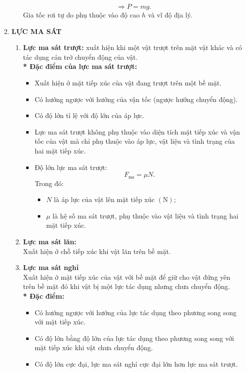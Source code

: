 \begin{enumerate}[label=\bfseries\Roman*.]
\begin{enumerate}[label=\bfseries\arabic*.]
	$$\Rightarrow P=mg.$$
	Gia tốc rơi tự do phụ thuộc vào độ cao $h$ và vĩ độ địa lý.
	\end{enumerate}
	\item \textbf{LỰC MA SÁT}
	\begin{enumerate}[label=\bfseries\arabic*.]
		\item \textbf{Lực ma sát trượt:} xuất hiện khi một vật trượt trên mặt vật khác và có tác dụng cản trở chuyển động của vật.\\
		\textbf{* Đặc điểm của lực ma sát trượt:}
		\begin{itemize}
			\item Xuất hiện ở mặt tiếp xúc của vật đang trượt trên một bề mặt.
			\item Có hướng ngược với hướng của vận tốc (ngược hướng chuyển động).
			\item Có độ lớn tỉ lệ với độ lớn của áp lực.
			\item Lực ma sát trượt không phụ thuộc vào diện tích mặt tiếp xúc và vận tốc của vật mà chỉ phụ thuộc vào áp lực, vật liệu và tình trạng của hai mặt tiếp xúc.
			\item Độ lớn lực ma sát trượt:
			$$F_{\text{ms}}=\mu N.$$
			Trong đó:
			\begin{itemize}
				\item $N$ là áp lực của vật lên mặt tiếp xúc $\left(\si{\newton}\right)$;
				\item $\mu$ là hệ số ma sát trượt, phụ thuộc vào vật liệu và tình trạng hai mặt tiếp xúc.
			\end{itemize}
		\end{itemize}
		\item \textbf{Lực ma sát lăn:}\\
		Xuất hiện ở chỗ tiếp xúc khi vật lăn trên bề mặt.
		\item \textbf{Lực ma sát nghỉ}\\
		Xuất hiện ở mặt tiếp xúc của vật với bề mặt để giữ cho vật đứng yên trên bề mặt đó khi vật bị một lực tác dụng nhưng chưa chuyển động.\\
		\textbf{* Đặc điểm:}
		\begin{itemize}
			\item Có hướng ngược với hướng của lực tác dụng theo phương song song với mặt tiếp xúc.
			\item Có độ lớn bằng độ lớn của lực tác dụng theo phương song song với mặt tiếp xúc khi vật chưa chuyển động.
			\item Có độ lớn cực đại, lực ma sát nghỉ cực đại lớn hơn lực ma sát trượt.
		\end{itemize}

\end{enumerate}
\end{enumerate}
